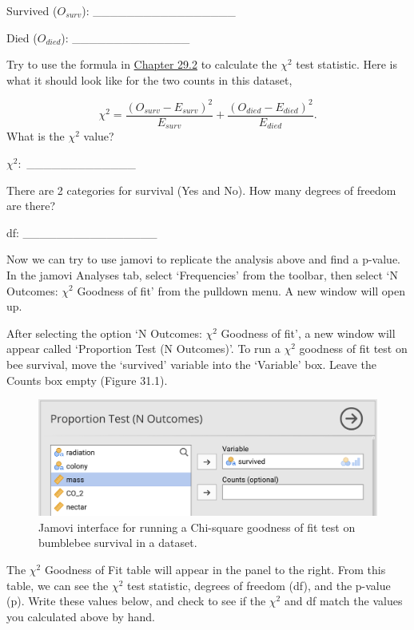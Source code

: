 \documentclass[
  openany]{scrbook}
\begin{document}
Survived (\(O_{surv}\)): \_\_\_\_\_\_\_\_\_\_\_\_\_\_\_\_\_

Died (\(O_{died}\)): \_\_\_\_\_\_\_\_\_\_\_\_\_\_

Try to use the formula in \protect\hyperlink{chi-squared-goodness-of-fit}{Chapter 29.2} to calculate the \(\chi^{2}\) test statistic.
Here is what it should look like for the two counts in this dataset,

\[\chi^{2} = \frac{(O_{surv} - E_{surv})^{2}}{E_{surv}} + \frac{(O_{died} - E_{died})^{2}}{E_{died}}.\]
What is the \(\chi^{2}\) value?

\(\chi^{2}:\) \_\_\_\_\_\_\_\_\_\_\_\_\_

There are 2 categories for survival (Yes and No).
How many degrees of freedom are there?

df: \_\_\_\_\_\_\_\_\_\_\_\_\_\_\_\_

Now we can try to use jamovi to replicate the analysis above and find a p-value.
In the jamovi Analyses tab, select `Frequencies' from the toolbar, then select `N Outcomes: \(\chi^{2}\) Goodness of fit' from the pulldown menu.
A new window will open up.

After selecting the option `N Outcomes: \(\chi^{2}\) Goodness of fit', a new window will appear called `Proportion Test (N Outcomes)'.
To run a \(\chi^{2}\) goodness of fit test on bee survival, move the `survived' variable into the `Variable' box.
Leave the Counts box empty (Figure 31.1).

\begin{figure}
\includegraphics[width=1\linewidth]{img/jamovi_goodness_of_fit_interface} \caption{Jamovi interface for running a Chi-square goodness of fit test on bumblebee survival in a dataset.}\label{fig:unnamed-chunk-132}
\end{figure}

The \(\chi^{2}\) Goodness of Fit table will appear in the panel to the right.
From this table, we can see the \(\chi^{2}\) test statistic, degrees of freedom (df), and the p-value (p).
Write these values below, and check to see if the \(\chi^{2}\) and df match the values you calculated above by hand.
\end{document}
